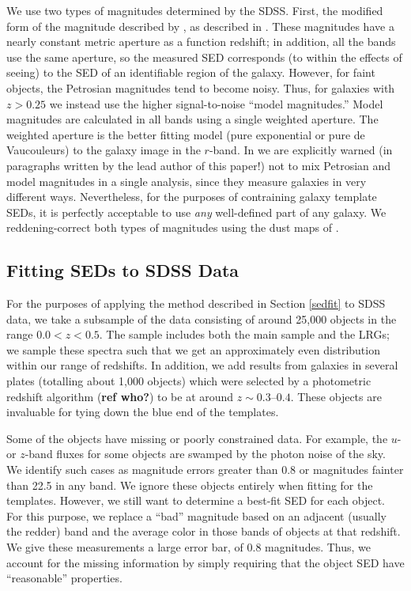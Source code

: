 \documentclass[10pt,preprint]{aastex}
\begin{document}
We use two types of magnitudes determined by the SDSS. First, the
modified form of the magnitude described by \citet{petrosian76a}, as
described in \citet{strauss02a}.  These magnitudes have a nearly
constant metric aperture as a function redshift; in addition, all the
bands use the same aperture, so the measured SED corresponds (to
within the effects of seeing) to the SED of an identifiable region of
the galaxy. However, for faint objects, the Petrosian magnitudes tend
to become noisy. Thus, for galaxies with $z>0.25$ we instead use the
higher signal-to-noise ``model magnitudes.'' Model magnitudes are
calculated in all bands using a single weighted aperture. The weighted
aperture is the better fitting model (pure exponential or pure de
Vaucouleurs) to the galaxy image in the $r$-band. In
\citet{stoughton01a} we are explicitly warned (in paragraphs written
by the lead author of this paper!)  not to mix Petrosian and model
magnitudes in a single analysis, since they measure galaxies in very
different ways. Nevertheless, for the purposes of contraining galaxy
template SEDs, it is perfectly acceptable to use {\it any}
well-defined part of any galaxy.  We reddening-correct both types of
magnitudes using the dust maps of \citet{schlegel98a}.

\subsection{Fitting SEDs to SDSS Data}

For the purposes of applying the method described in Section
\ref{sedfit} to SDSS data, we take a subsample of the data consisting
of around 25,000 objects in the range $0.0<z<0.5$. The sample includes
both the main sample and the LRGs; we sample these spectra such that
we get an approximately even distribution within our range of
redshifts. In addition, we add results from galaxies in several plates
(totalling about 1,000 objects) which were selected by a photometric
redshift algorithm ({\bf ref who?}) to be at around $z\sim
0.3$--$0.4$. These objects are invaluable for tying down the blue end
of the templates.

Some of the objects have missing or poorly constrained data. For
example, the $u$- or $z$-band fluxes for some objects are swamped by
the photon noise of the sky. We identify such cases as magnitude
errors greater than 0.8 or magnitudes fainter than 22.5 in any
band. We ignore these objects entirely when fitting for the
templates. However, we still want to determine a best-fit SED for each
object. For this purpose, we replace a ``bad'' magnitude based on an
adjacent (usually the redder) band and the average color in those
bands of objects at that redshift. We give these measurements a large
error bar, of 0.8 magnitudes. Thus, we account for the missing
information by simply requiring that the object SED have
``reasonable'' properties.
\end{document}
